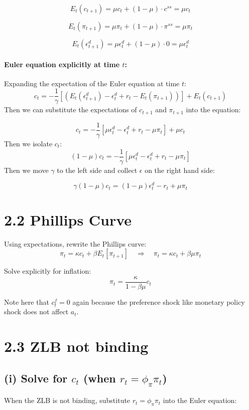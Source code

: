 \documentclass[12pt]{article}
\begin{document}
\[
E_t(c_{t+1}) = \mu c_t + (1 - \mu)\cdot c^{ss} = \mu c_t
\]

\[
E_t(\pi_{t+1}) = \mu \pi_t + (1 - \mu)\cdot \pi^{ss} = \mu \pi_t
\]

\[
E_t(\epsilon_{t+1}^d) = \mu \epsilon_t^d + (1 - \mu)\cdot 0 = \mu \epsilon_t^d
\]

\paragraph{Euler equation explicitly at time \(t\):} Expanding the expectation of the Euler equation at time \(t\):
\[
c_t = -\frac{1}{\gamma}\left[(E_t(\epsilon_{t+1}^d) - \epsilon_t^d + r_t - E_t(\pi_{t+1}))\right] + E_t(c_{t+1})
\]
Then we can substitute the expectations of \(c_{t+1}\) and \(\pi_{t+1}\) into the equation:

\[
c_t = -\frac{1}{\gamma}\left[\mu \epsilon_t^d - \epsilon_t^d + r_t - \mu \pi_t\right] + \mu c_t
\]
Then we isolate $c_t$:
\[
(1-\mu)c_t=-\frac{1}{\gamma}\left[\mu \epsilon_t^d - \epsilon_t^d + r_t - \mu \pi_t\right]
\]
Then we move $\gamma$ to the left side and collect $\epsilon$ on the right hand side:

\[
\gamma(1 - \mu)c_t = (1 - \mu)\epsilon_t^d - r_t + \mu \pi_t
\]

\section*{2.2 Phillips Curve}

Using expectations, rewrite the Phillips curve:
\[
\pi_t = \kappa c_t + \beta E_t[\pi_{t+1}] \quad \Rightarrow \quad \pi_t = \kappa c_t + \beta \mu \pi_t
\]

Solve explicitly for inflation:
\[
\pi_t = \frac{\kappa}{1 - \beta \mu} c_t
\]

Note here that $c_t^f=0$ again because the preference shock like monetary policy shock does not affect $a_t$.

\section*{2.3 ZLB not binding}

\subsection*{(i) Solve for \(c_t\) (when \(r_t = \phi_{\pi}\pi_t\))}

When the ZLB is not binding, substitute \(r_t = \phi_{\pi}\pi_t\) into the Euler equation:
\end{document}
